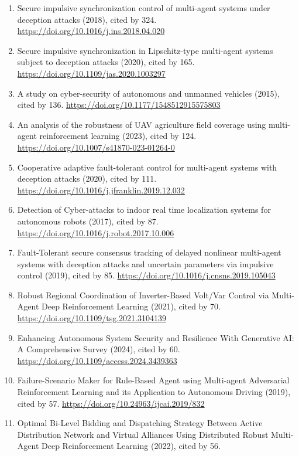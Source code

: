 \documentclass[
]{article}
\providecommand{\tightlist}{%
  \setlength{\itemsep}{0pt}\setlength{\parskip}{0pt}}
\begin{document}
\begin{enumerate}
\def\labelenumi{\arabic{enumi}.}
\tightlist
\item
  Secure impulsive synchronization control of multi-agent systems under
  deception attacks (2018), cited by 324.
  \url{https://doi.org/10.1016/j.ins.2018.04.020}
\item
  Secure impulsive synchronization in Lipschitz-type multi-agent systems
  subject to deception attacks (2020), cited by 165.
  \url{https://doi.org/10.1109/jas.2020.1003297}
\item
  A study on cyber-security of autonomous and unmanned vehicles (2015),
  cited by 136. \url{https://doi.org/10.1177/1548512915575803}
\item
  An analysis of the robustness of UAV agriculture field coverage using
  multi-agent reinforcement learning (2023), cited by 124.
  \url{https://doi.org/10.1007/s41870-023-01264-0}
\item
  Cooperative adaptive fault-tolerant control for multi-agent systems
  with deception attacks (2020), cited by 111.
  \url{https://doi.org/10.1016/j.jfranklin.2019.12.032}
\item
  Detection of Cyber-attacks to indoor real time localization systems
  for autonomous robots (2017), cited by 87.
  \url{https://doi.org/10.1016/j.robot.2017.10.006}
\item
  Fault-Tolerant secure consensus tracking of delayed nonlinear
  multi-agent systems with deception attacks and uncertain parameters
  via impulsive control (2019), cited by 85.
  \url{https://doi.org/10.1016/j.cnsns.2019.105043}
\item
  Robust Regional Coordination of Inverter-Based Volt/Var Control via
  Multi-Agent Deep Reinforcement Learning (2021), cited by 70.
  \url{https://doi.org/10.1109/tsg.2021.3104139}
\item
  Enhancing Autonomous System Security and Resilience With Generative
  AI: A Comprehensive Survey (2024), cited by 60.
  \url{https://doi.org/10.1109/access.2024.3439363}
\item
  Failure-Scenario Maker for Rule-Based Agent using Multi-agent
  Adversarial Reinforcement Learning and its Application to Autonomous
  Driving (2019), cited by 57.
  \url{https://doi.org/10.24963/ijcai.2019/832}
\item
  Optimal Bi-Level Bidding and Dispatching Strategy Between Active
  Distribution Network and Virtual Alliances Using Distributed Robust
  Multi-Agent Deep Reinforcement Learning (2022), cited by 56.

\end{enumerate}
\end{document}

